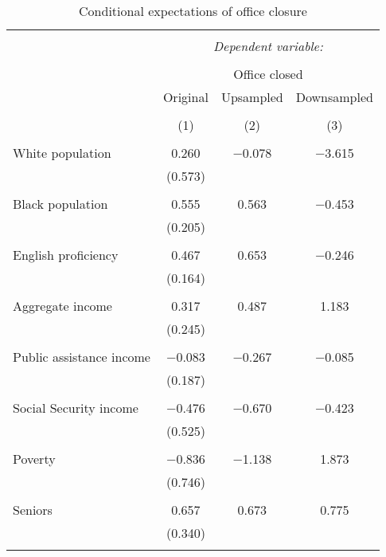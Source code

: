 
\begin{table}[!htbp] \centering 
  \caption{Conditional expectations of office closure} 
  \label{} 
\footnotesize 
\begin{tabular}{@{\extracolsep{5pt}}lccc} 
\\[-1.8ex]\hline 
\hline \\[-1.8ex] 
 & \multicolumn{3}{c}{\textit{Dependent variable:}} \\ 
\cline{2-4} 
\\[-1.8ex] & \multicolumn{3}{c}{Office closed} \\ 
 & Original & Upsampled & Downsampled \\ 
\\[-1.8ex] & (1) & (2) & (3)\\ 
\hline \\[-1.8ex] 
 White population & 0.260 & $-$0.078 & $-$3.615 \\ 
  & (0.573) &  &  \\ 
  & & & \\ 
 Black population & 0.555 & 0.563 & $-$0.453 \\ 
  & (0.205) &  &  \\ 
  & & & \\ 
 English proficiency & 0.467 & 0.653 & $-$0.246 \\ 
  & (0.164) &  &  \\ 
  & & & \\ 
 Aggregate income & 0.317 & 0.487 & 1.183 \\ 
  & (0.245) &  &  \\ 
  & & & \\ 
 Public assistance income & $-$0.083 & $-$0.267 & $-$0.085 \\ 
  & (0.187) &  &  \\ 
  & & & \\ 
 Social Security income & $-$0.476 & $-$0.670 & $-$0.423 \\ 
  & (0.525) &  &  \\ 
  & & & \\ 
 Poverty & $-$0.836 & $-$1.138 & 1.873 \\ 
  & (0.746) &  &  \\ 
  & & & \\ 
 Seniors & 0.657 & 0.673 & 0.775 \\ 
  & (0.340) &  &  \\ 
  & & & \\ 

\end{tabular}
\end{table}
